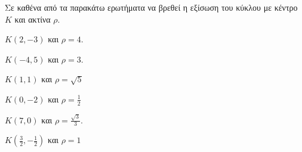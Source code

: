 Σε καθένα από τα παρακάτω ερωτήματα να βρεθεί η εξίσωση του κύκλου με κέντρο $ K $ και ακτίνα $ \rho $.
\begin{multicols}{2}
\begin{alist}
\item $ Κ(2,-3) $ και $ \rho=4 $.
\item $ Κ(-4,5) $ και $ \rho=3 $.
\item $ K(1,1) $ και $ \rho=\sqrt{5} $
\item $ K(0,-2) $ και $ \rho=\frac{1}{2} $
\item $ K(7,0) $ και $\rho=\frac{\sqrt{3}}{3}$.
\item $ Κ\left(\frac{3}{2},-\frac{1}{2}\right) $ και $ \rho=1 $
\end{alist}
\end{multicols}
